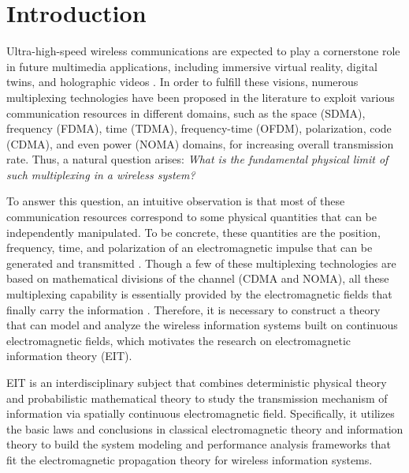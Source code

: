 \documentclass[journal,twocolumn]{IEEEtran}
\begin{document}
\section{Introduction}
Ultra-high-speed wireless communications are expected to play a cornerstone role in future multimedia applications, including immersive virtual reality, digital twins, and holographic videos \cite{saad2019vision}. 
In order to fulfill these visions, numerous multiplexing technologies have been proposed in the literature to exploit various communication resources in different domains, such as the space (SDMA), frequency (FDMA), time (TDMA), frequency-time (OFDM), polarization, code (CDMA), and even power (NOMA) domains, for increasing overall transmission rate. 
Thus, a natural question arises: {\it What is the fundamental physical limit of such multiplexing in a wireless system?}

To answer this question, an intuitive observation is that most of these communication resources correspond to some physical quantities that can be independently manipulated. To be concrete, these quantities are the position, frequency, time, and polarization of an electromagnetic impulse that can be generated and transmitted \cite{shah2022survey}. Though a few of these multiplexing technologies are based on mathematical divisions of the channel (CDMA and NOMA), all these multiplexing capability is essentially provided by the electromagnetic fields that finally carry the information \cite{gruber2008new}. Therefore, it is necessary to construct a theory that can model and analyze the wireless information systems built on continuous electromagnetic fields, which motivates the research on electromagnetic information theory (EIT).

EIT is an interdisciplinary subject that combines deterministic physical theory and probabilistic mathematical theory to study the transmission mechanism of information via spatially continuous electromagnetic field. 
Specifically, it utilizes the basic laws and conclusions in classical electromagnetic theory and information theory to build the system modeling and performance analysis frameworks that fit the electromagnetic propagation theory for wireless information systems. 
\end{document}
